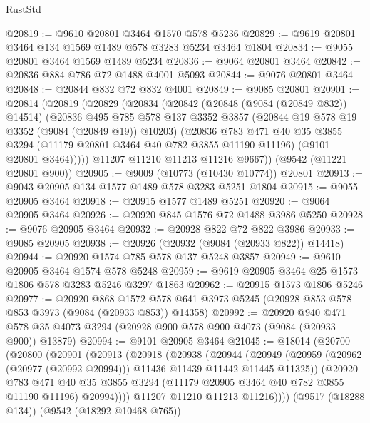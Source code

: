\begin{lexlean}{RustStd}
\begin{coremodule}
@20819 := @9610 @20801 @3464 @1570 @578 @5236
@20829 := @9619 @20801 @3464 @134 @1569 @1489 @578 @3283 @5234 @3464 @1804
@20834 := @9055 @20801 @3464 @1569 @1489 @5234
@20836 := @9064 @20801 @3464
@20842 := @20836 @884 @786 @72 @1488 @4001 @5093
@20844 := @9076 @20801 @3464
@20848 := @20844 @832 @72 @832 @4001
@20849 := @9085 @20801
@20901 := @20814
    (@20819
      (@20829
        (@20834
          (@20842
            (@20848 (@9084 (@20849 @832)) @14514)
            (@20836
              @495
              @785
              @578
              @137
              @3352
              @3857
              (@20844 @19 @578 @19 @3352 (@9084 (@20849 @19)) @10203)
              (@20836
                @783
                @471
                @40
                @35
                @3855
                @3294
                (@11179 @20801 @3464 @40 @782 @3855 @11190 @11196)
                (@9101 @20801 @3464)))))
        @11207
        @11210
        @11213
        @11216
        @9667))
    (@9542 (@11221 @20801 @900))
@20905 := @9009 (@10773 (@10430 @10774)) @20801
@20913 := @9043 @20905 @134 @1577 @1489 @578 @3283 @5251 @1804
@20915 := @9055 @20905 @3464
@20918 := @20915 @1577 @1489 @5251
@20920 := @9064 @20905 @3464
@20926 := @20920 @845 @1576 @72 @1488 @3986 @5250
@20928 := @9076 @20905 @3464
@20932 := @20928 @822 @72 @822 @3986
@20933 := @9085 @20905
@20938 := @20926 (@20932 (@9084 (@20933 @822)) @14418)
@20944 := @20920 @1574 @785 @578 @137 @5248 @3857
@20949 := @9610 @20905 @3464 @1574 @578 @5248
@20959 := @9619 @20905 @3464 @25 @1573 @1806 @578 @3283 @5246 @3297 @1863
@20962 := @20915 @1573 @1806 @5246
@20977 := @20920
    @868
    @1572
    @578
    @641
    @3973
    @5245
    (@20928 @853 @578 @853 @3973 (@9084 (@20933 @853)) @14358)
@20992 := @20920
    @940
    @471
    @578
    @35
    @4073
    @3294
    (@20928 @900 @578 @900 @4073 (@9084 (@20933 @900)) @13879)
@20994 := @9101 @20905 @3464
@21045 := @18014
    (@20700
      (@20800
        (@20901
          (@20913
            (@20918
              (@20938
                (@20944
                  (@20949
                    (@20959 (@20962 (@20977 (@20992 @20994))) @11436 @11439 @11442 @11445 @11325))
                  (@20920
                    @783
                    @471
                    @40
                    @35
                    @3855
                    @3294
                    (@11179 @20905 @3464 @40 @782 @3855 @11190 @11196)
                    @20994))))
            @11207
            @11210
            @11213
            @11216))))
    (@9517 (@18288 @134))
    (@9542 (@18292 @10468 @765))

\end{coremodule}
\end{lexlean}
